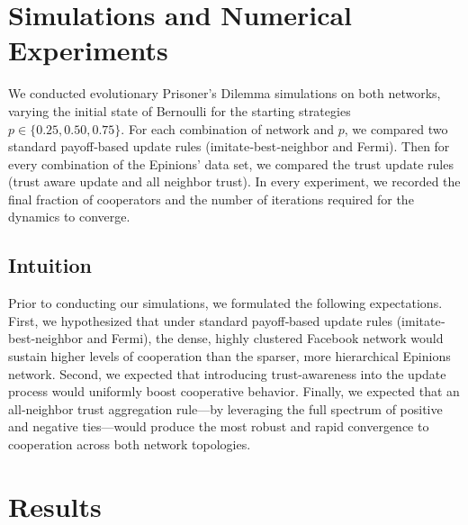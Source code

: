 \section{Simulations and Numerical Experiments}

We conducted evolutionary Prisoner’s Dilemma simulations on both networks, varying the initial state of Bernoulli for the starting strategies \(p \in \{0.25, 0.50, 0.75\}\). For each combination of network and \(p\), we compared two standard payoff‐based update rules (imitate‐best‐neighbor and Fermi). Then for every combination of the Epinions' data set, we compared the trust update rules (trust aware update and all neighbor trust).  In every experiment, we recorded the final fraction of cooperators and the number of iterations required for the dynamics to converge.


\subsection{Intuition}
Prior to conducting our simulations, we formulated the following expectations. First, we hypothesized that under standard payoff‐based update rules (imitate‐best‐neighbor and Fermi), the dense, highly clustered Facebook network would sustain higher levels of cooperation than the sparser, more hierarchical Epinions network. Second, we expected that introducing trust-awareness into the update process would uniformly boost cooperative behavior. Finally, we expected that an all‐neighbor trust aggregation rule—by leveraging the full spectrum of positive and negative ties—would produce the most robust and rapid convergence to cooperation across both network topologies.


\section{Results}

